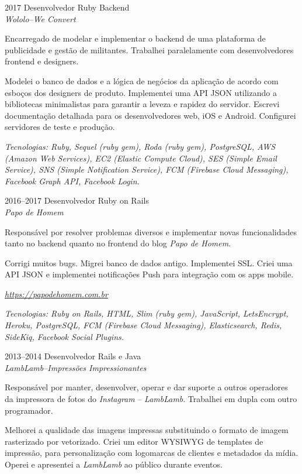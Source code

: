 \documentclass[a4paper]{simplecv}
\begin{document}
\begin{topic}
\item[2017] Desenvolvedor Ruby Backend\\
	{\em\small Wololo--We Convert}

	Encarregado de modelar e implementar o backend de uma plataforma de
	publicidade e gestão de militantes. Trabalhei paralelamente com
	desenvolvedores frontend e designers.

	Modelei o banco de dados e a lógica de negócios da aplicação de acordo
	com esboços dos designers de produto. Implementei uma API JSON
	utilizando a bibliotecas minimalistas para garantir a leveza e rapidez
	do servidor. Escrevi documentação detalhada para os desenvolvedores
	web, iOS e Android. Configurei servidores de teste e produção.

	{\em\scriptsize Tecnologias: Ruby, Sequel (ruby gem), Roda (ruby gem),
	PostgreSQL, AWS (Amazon Web Services), EC2 (Elastic Compute Cloud), SES
	(Simple Email Service), SNS (Simple Notification Service), FCM
	(Firebase Cloud Messaging), Facebook Graph API, Facebook Login.}

\item[2016--2017] Desenvolvedor Ruby on Rails\\
	{\em\small Papo de Homem}

	Responsável por resolver problemas diversos e implementar novas
	funcionalidades tanto no backend quanto no frontend do blog \emph{Papo
	de Homem}.

	Corrigi muitos bugs. Migrei banco de dados antigo. Implementei SSL.
	Criei uma API JSON e implementei notificações Push para integração com
	os apps mobile.

	{\em\scriptsize \url{https://papodehomem.com.br}}

	{\em\scriptsize Tecnologias: Ruby on Rails, HTML, Slim (ruby gem),
	JavaScript, LetsEncrypt, Heroku, PostgreSQL, FCM (Firebase Cloud
	Messaging), Elasticsearch, Redis, SideKiq, Facebook Social Plugins.}

\item[2013--2014] Desenvolvedor Rails e Java\\
	{\em\small LambLamb--Impressões Impressionantes}

	Responsável por manter, desenvolver, operar e dar suporte a outros
	operadores da impressora de fotos do \emph{Instagram} --
	\emph{LambLamb}. Trabalhei em dupla com outro programador.

	Melhorei a qualidade das imagens impressas substituindo o formato de
	imagem rasterizado por vetorizado. Criei um editor WYSIWYG de templates
	de impressão, para personalização com logomarcas de clientes e
	metadados da mídia. Operei e apresentei a \emph{LambLamb} ao público
	durante eventos.


\end{topic}
\end{document}
